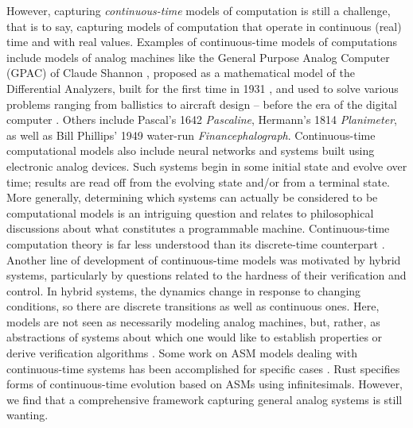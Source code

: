\documentclass[envcountsame]{llncs}
\begin{document}
However, capturing \emph{continuous-time} models of computation is
still a challenge, that is to say, capturing models of computation that operate
in continuous (real) time and with real values.
Examples of continuous-time models of computations include models of analog
machines like the General Purpose Analog Computer (GPAC) of Claude Shannon
\cite{Sha41}, proposed as a mathematical model of the Differential
Analyzers, built for the first time in 1931 \cite{Bush31}, and
used to solve various problems ranging from
ballistics to aircraft design -- before the era of the digital computer
\cite{Nyc96}. 
Others include
Pascal's 1642 \textit{Pascaline},
Hermann's 1814 \textit{Planimeter},
as well as
Bill Phillips' 1949 water-run \textit{Financephalograph}.
Continuous-time computational models also include neural networks
and systems built using electronic
analog devices.
Such systems begin in some initial state and evolve over time;
results are read off from the evolving
state and/or from a terminal state. More generally, determining which
systems can actually be considered to be computational models is an
intriguing question and relates to philosophical discussions about
what constitutes a programmable machine.
Continuous-time
computation theory is far less understood than its discrete-time
counterpart \cite{Survey}.
Another line of development of continuous-time  models was
 motivated by hybrid systems, particularly by questions related to
the hardness of their verification and control.  In hybrid
 systems, the dynamics change in response to changing
conditions, so there are discrete transitions as well as continuous
ones.
Here, models are not
seen as necessarily modeling analog machines, but,
rather, as abstractions of systems about
which one would like to establish properties or derive
verification algorithms \cite{Survey}.
Some work on ASM models dealing with
continuous-time systems has been accomplished
for specific cases \cite{Cohen,Cohen2}.
Rust \cite{rust2000hybrid} specifies  forms of continuous-time evolution
based on ASMs using infinitesimals.
However, we find that a comprehensive framework
capturing general analog systems is still wanting.
\end{document}
